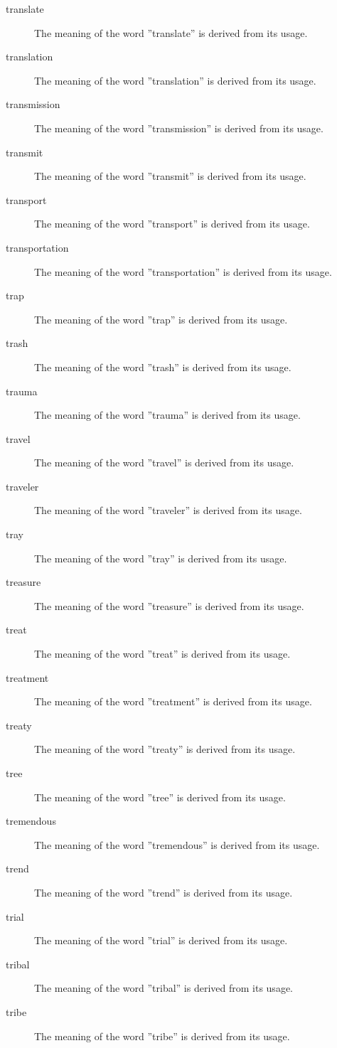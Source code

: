 \documentclass[12pt, letterpaper]{memoir}
\begin{document}
\begin{description}
\item[translate] The meaning of the word ''translate'' is derived from its usage.
\item[translation] The meaning of the word ''translation'' is derived from its usage.
\item[transmission] The meaning of the word ''transmission'' is derived from its usage.
\item[transmit] The meaning of the word ''transmit'' is derived from its usage.
\item[transport] The meaning of the word ''transport'' is derived from its usage.
\item[transportation] The meaning of the word ''transportation'' is derived from its usage.
\item[trap] The meaning of the word ''trap'' is derived from its usage.
\item[trash] The meaning of the word ''trash'' is derived from its usage.
\item[trauma] The meaning of the word ''trauma'' is derived from its usage.
\item[travel] The meaning of the word ''travel'' is derived from its usage.
\item[traveler] The meaning of the word ''traveler'' is derived from its usage.
\item[tray] The meaning of the word ''tray'' is derived from its usage.
\item[treasure] The meaning of the word ''treasure'' is derived from its usage.
\item[treat] The meaning of the word ''treat'' is derived from its usage.
\item[treatment] The meaning of the word ''treatment'' is derived from its usage.
\item[treaty] The meaning of the word ''treaty'' is derived from its usage.
\item[tree] The meaning of the word ''tree'' is derived from its usage.
\item[tremendous] The meaning of the word ''tremendous'' is derived from its usage.
\item[trend] The meaning of the word ''trend'' is derived from its usage.
\item[trial] The meaning of the word ''trial'' is derived from its usage.
\item[tribal] The meaning of the word ''tribal'' is derived from its usage.
\item[tribe] The meaning of the word ''tribe'' is derived from its usage.

\end{description}
\end{document}
